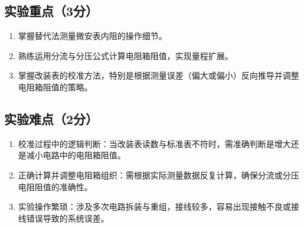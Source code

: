 \documentclass{../template/Report}%
\begin{document}
\subsection{实验重点（3分）}
\begin{enumerate}
    \item 掌握替代法测量微安表内阻的操作细节。
    \item 熟练运用分流与分压公式计算电阻箱阻值，实现量程扩展。
    \item 掌握改装表的校准方法，特别是根据测量误差（偏大或偏小）反向推导并调整电阻箱阻值的策略。
\end{enumerate}

\subsection{实验难点（2分）}
\begin{enumerate}
    \item 校准过程中的逻辑判断：当改装表读数与标准表不符时，需准确判断是增大还是减小电路中的电阻箱阻值。
    \item 正确计算并调整电阻箱组织：需根据实际测量数据反复计算，确保分流或分压电阻阻值的准确性。
    \item 实验操作繁琐：涉及多次电路拆装与重组，接线较多，容易出现接触不良或接线错误导致的系统误差。
\end{enumerate}
\end{document}

